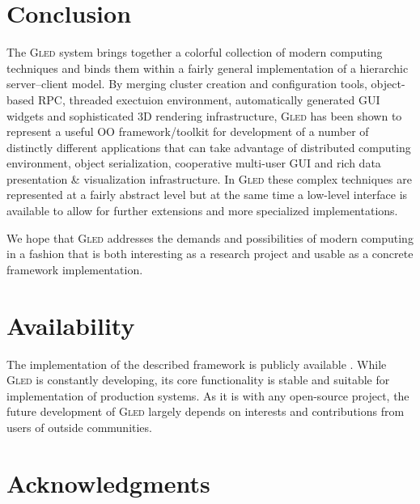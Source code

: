 \documentclass[a4paper,11pt]{article}
\def\gled{\textsc{Gled}\xspace}
\begin{document}
\section{Conclusion}

The \gled system brings together a colorful collection of modern
computing techniques and binds them within a fairly general
implementation of a hierarchic server--client model. By merging
cluster creation and configuration tools, object-based RPC, threaded
exectuion environment, automatically generated GUI widgets and
sophisticated 3D rendering infrastructure, \gled has been shown to
represent a useful OO framework/toolkit for development of a number of
distinctly different applications that can take advantage of
distributed computing environment, object serialization, cooperative
multi-user GUI and rich data presentation \& visualization
infrastructure. In \gled these complex techniques are represented at a
fairly abstract level but at the same time a low-level interface is
available to allow for further extensions and more specialized
implementations.

We hope that \gled addresses the demands and possibilities of modern
computing in a fashion that is both interesting as a research project
and usable as a concrete framework implementation.


\section*{Availability}

The implementation of the described framework is publicly available
\cite{gled.org}. While \gled is constantly developing, its core
functionality is stable and suitable for implementation of production
systems. As it is with any open-source project, the future
development of \gled largely depends on interests and contributions
from users of outside communities.

\section*{Acknowledgments}
\end{document}
